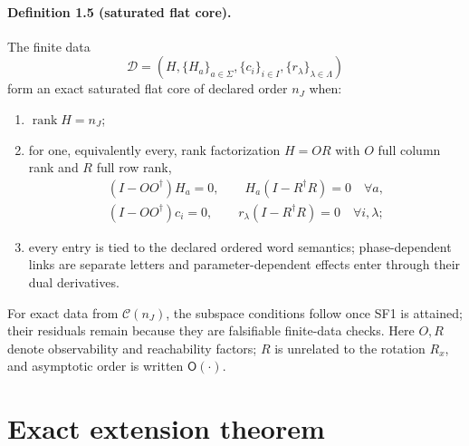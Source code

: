 \documentclass[aps,prl,reprint,superscriptaddress,nofootinbib]{revtex4-2}
\newcommand{\rank}{\operatorname{rank}}
\newcommand{\cC}{\mathcal C}
\newcommand{\cD}{\mathcal D}
\begin{document}
\paragraph{Definition 1.5 (saturated flat core).}
The finite data
\begin{equation}
 \cD=(H,\{H_a\}_{a\in\Sigma},\{c_i\}_{i\in I},
 \{r_\lambda\}_{\lambda\in\Lambda})
 \label{eq:data-core}
\end{equation}
form an exact saturated flat core of declared order $n_J$ when:
\begin{enumerate}
\item[(SF1)] $\rank H=n_J$;
\item[(SF2)] for one, equivalently every, rank factorization $H=OR$ with $O$ full column rank and $R$ full row rank,
\begin{equation}
 \begin{gathered}
 (I-OO^\dagger)H_a=0,
 \qquad H_a(I-R^\dagger R)=0\quad\forall a,\\
 (I-OO^\dagger)c_i=0,
 \qquad r_\lambda(I-R^\dagger R)=0\quad\forall i,\lambda;
 \end{gathered}
 \label{eq:SF23}
\end{equation}
\item[(SF3)] every entry is tied to the declared ordered word semantics; phase-dependent links are separate letters and parameter-dependent effects enter through their dual derivatives.
\end{enumerate}
For exact data from $\cC(n_J)$, the subspace conditions follow once SF1 is attained; their residuals remain because they are falsifiable finite-data checks.  Here $O,R$ denote observability and reachability factors; $R$ is unrelated to the rotation $R_x$, and asymptotic order is written $\mathsf O(\cdot)$.

\section{Exact extension theorem}
\label{sec:exact-proof}
\end{document}
